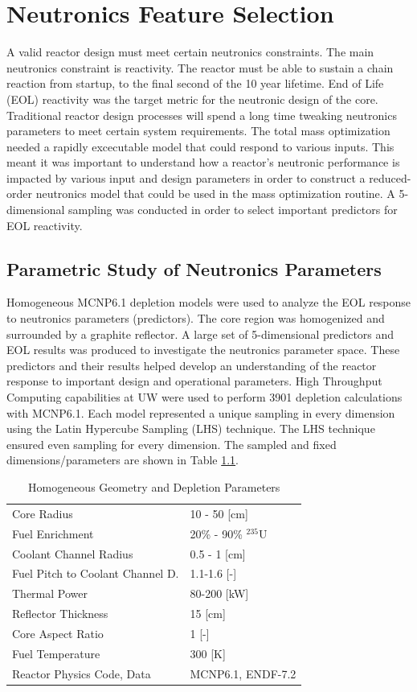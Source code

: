 \chapter{Neutronics Feature Selection} \label{ch:sweeps}
A valid reactor design must meet certain neutronics constraints. The main
neutronics constraint is reactivity. The reactor must be able to sustain a chain
reaction from startup, to the final second of the 10 year lifetime. End of Life
(EOL) reactivity was the target metric for the neutronic design of the core.
Traditional reactor design processes will spend a long time tweaking neutronics
parameters to meet certain system requirements. The total mass optimization
needed a rapidly excecutable model that could respond to various inputs.
This meant it was important to understand how a reactor's neutronic
performance is impacted by various input and design parameters in order to
construct a reduced-order neutronics model that could be used in the mass
optimization routine. A 5-dimensional 
sampling was conducted in order to select important predictors for EOL
reactivity.

\section{Parametric Study of Neutronics Parameters}
Homogeneous MCNP6.1 depletion models were used to analyze the EOL \keff response
to neutronics parameters (predictors). The core region was homogenized and
surrounded by a graphite reflector. A large set of 5-dimensional predictors and
EOL \keff results was produced to investigate the neutronics parameter space.
These predictors and their results helped develop an understanding of the
reactor response to important design and operational parameters. High Throughput
Computing capabilities at UW were used to perform 3901 depletion calculations
with MCNP6.1. Each model represented a unique sampling in every dimension using
the Latin Hypercube Sampling (LHS) technique\citep{LHS}. The LHS technique ensured even
sampling for every dimension. The sampled and fixed dimensions/parameters are
shown in Table \ref{tab:lhs_sweep_vars}.

\begin{table}[h]
  \centering
  \caption{Homogeneous Geometry and Depletion Parameters}
  \begin{tabular}{ll}
    \toprule
     Core Radius                		   & 10 - 50 [cm] \\
     Fuel Enrichment 					   & 20\% - 90\% $^{235}$U\\
     Coolant Channel Radius                & 0.5 - 1 [cm] \\
     Fuel Pitch to Coolant Channel D.      & 1.1-1.6 [-]\\
     Thermal Power						   & 80-200 [kW]\\
     \hdashline
     Reflector Thickness				   & 15 [cm]\\
     Core Aspect Ratio					   & 1 [-] \\
     Fuel Temperature					   & 300 [K]\\
     Reactor Physics Code, Data			   & MCNP6.1, ENDF-7.2
  \end{tabular}
  \label{tab:lhs_sweep_vars}
\end{table}


